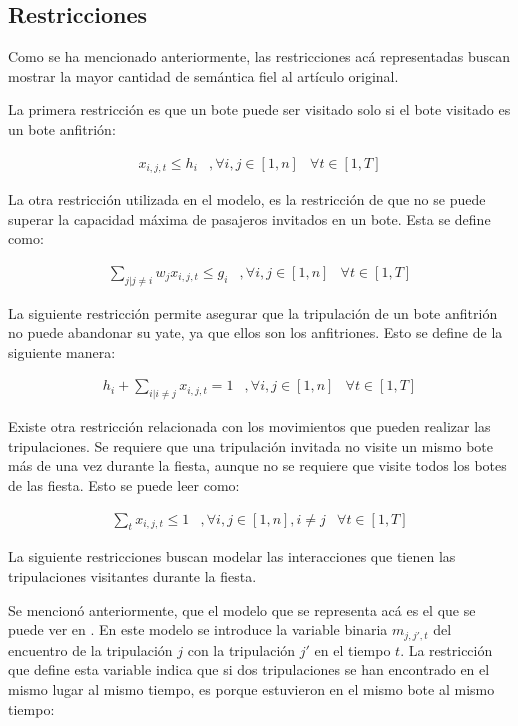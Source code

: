 \documentclass[letter, 10pt]{article}
\begin{document}
\subsection{Restricciones}
Como se ha mencionado anteriormente, las restricciones acá representadas buscan mostrar la mayor cantidad de semántica fiel al artículo original.

La primera restricción es que un bote puede ser visitado solo si el bote visitado es un bote anfitrión:

\begin{eqnarray}
x_{i,j,t} \leq h_i & , \forall i,j \in [1,n] & \forall t \in [1,T]
\end{eqnarray}

La otra restricción utilizada en el modelo, es la restricción de que no se puede superar la capacidad máxima de pasajeros invitados en un bote. Esta se define como:

\begin{eqnarray}
\sum_{j|j\neq i} w_jx_{i,j,t} \leq g_i & , \forall i,j \in [1,n] & \forall t \in [1,T]
\end{eqnarray}

La siguiente restricción permite asegurar que la tripulación de un bote anfitrión no puede abandonar su yate, ya que ellos son los anfitriones. Esto se define de la siguiente manera:

\begin{eqnarray}
h_i + \sum_{i|i\neq j}x_{i,j,t} = 1 & , \forall i,j \in [1,n] & \forall t \in [1,T]
\end{eqnarray}

Existe otra restricción relacionada con los movimientos que pueden realizar las tripulaciones. Se requiere que una tripulación invitada no visite un mismo bote más de una vez durante la fiesta, aunque no se requiere que visite todos los botes de las fiesta. Esto se puede leer como:

\begin{eqnarray}
\sum_tx_{i,j,t} \leq 1 & , \forall i,j \in [1,n], i \neq j & \forall t \in [1,T]
\end{eqnarray}

La siguiente restricciones buscan modelar las interacciones que tienen las tripulaciones visitantes durante la fiesta.

Se mencionó anteriormente, que el modelo que se representa acá es el que se puede ver en \cite{PPPAsMIP}. En este modelo se introduce la variable binaria $m_{j,j',t}$ del encuentro de la tripulación $j$ con la tripulación $j'$ en el tiempo $t$. La restricción que define esta variable indica que si dos tripulaciones se han encontrado en el mismo lugar al mismo tiempo, es porque estuvieron en el mismo bote al mismo tiempo:
\end{document}
